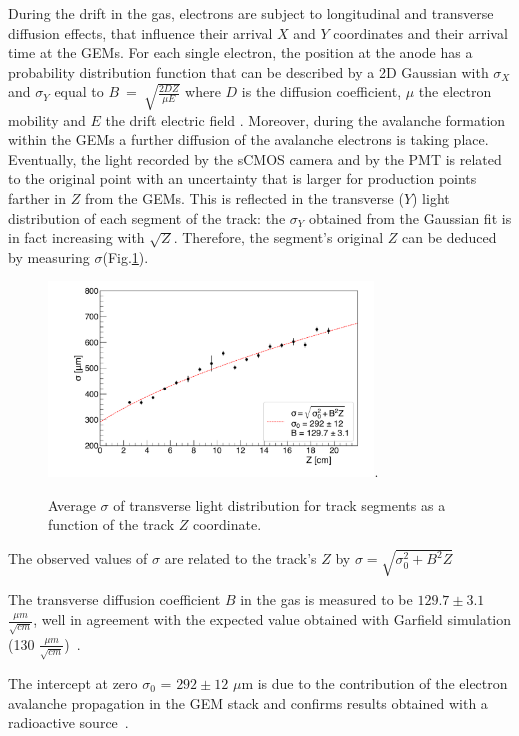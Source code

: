 \documentclass[review]{elsarticle}
\begin{document}
 During the drift in the gas, electrons are subject to longitudinal and transverse diffusion effects, 
 that influence their arrival $X$ and $Y$ coordinates and their arrival time at the GEMs.
 For each single electron, the position at the anode has a probability distribution function that can be described by a 2D Gaussian with $\sigma_X$  and $\sigma_Y$ equal to $B~=~\sqrt{\frac{2DZ}{\mu E}}$ where $D$ is the diffusion coefficient, $\mu$ the electron mobility and $E$ the drift electric field \cite{bib:rolandiblum}. Moreover, during the avalanche formation within the GEMs a further diffusion of the avalanche electrons is taking place. Eventually, the light recorded by the sCMOS camera and by the PMT is related to the original point with an uncertainty that is larger for production points farther in $Z$ from the GEMs.
  This is reflected in the transverse ($Y$) light distribution of each segment of the track: the $\sigma_Y$  obtained from  the  Gaussian fit is in fact increasing with $\sqrt{Z}$. Therefore, the segment's original $Z$ can be deduced by measuring  $\sigma$(Fig.\ref{fig:Diffusion}).
  
  \begin{figure}[!ht]
\centering
\includegraphics[width=3.4in]{Fig8-Diffusion-Z.pdf}\DeclareGraphicsExtensions.
\caption{ Average $\sigma$ of transverse light distribution for track segments as a function of the track $Z $ coordinate. }
\label{fig:Diffusion}
\end{figure}

 The observed values of $\sigma$  are related to the track's $Z$  by  $\sigma = \sqrt{\sigma_0^2 + B^2 Z }$ 
 
 The transverse  diffusion coefficient $B$ in the gas is measured to be $129.7 \pm 3.1$ $\frac{\mu m}{\sqrt{cm}}$,  well in agreement with the expected value obtained with Garfield simulation (130 $\frac{\mu m}{\sqrt{cm}}$)~\cite{bib:stab}.

 The intercept at zero $\sigma_0$ =  $292 \pm 12$ $\mu$m is due to the contribution of the electron avalanche propagation in the GEM stack and confirms results obtained with a radioactive source~\cite{bib:stab}.
 
\end{document}
